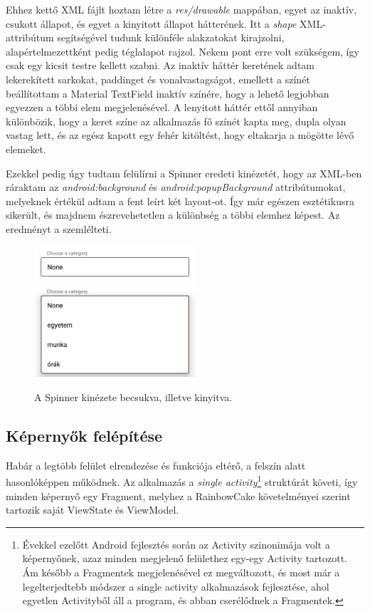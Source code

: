 Ehhez kettő XML fájlt hoztam létre a \emph{res/drawable} mappában, egyet az inaktív, csukott állapot, és egyet a kinyitott állapot hátterének. Itt a \emph{shape} XML-attribútum segítségével tudunk különféle alakzatokat kirajzolni, alapértelmezettként pedig téglalapot rajzol. Nekem pont erre volt szükségem, így csak egy kicsit testre kellett szabni. Az inaktív háttér keretének adtam lekerekített sarkokat, paddinget és vonalvastagságot, emellett a színét beállítottam a Material TextField inaktív színére, hogy a lehető legjobban egyezzen a többi elem megjelenésével. A lenyitott háttér ettől annyiban különbözik, hogy a keret színe az alkalmazás fő színét kapta meg, dupla olyan vastag lett, és az egész kapott egy fehér kitöltést, hogy eltakarja a mögötte lévő elemeket. 

Ezekkel pedig úgy tudtam felülírni a Spinner eredeti kinézetét, hogy az XML-ben ráraktam az \emph{android:background} és \emph{android:popupBackground} attribútumokat, melyeknek értékül adtam a fent leírt két layout-ot. Így már egészen esztétikusra sikerült, és majdnem észrevehetetlen a különbség a többi elemhez képest. Az eredményt a  szemlélteti.

\begin{figure}[!ht]
	\centering
	\includegraphics[width=60mm, keepaspectratio]{figures/custom_spinner_closed.png}
	\includegraphics[width=60mm, keepaspectratio]{figures/custom_spinner_open.png}
	\caption{A Spinner kinézete becsukva, illetve kinyitva.}
	\label{fig:CustomSpinner}
\end{figure}

\subsection{Képernyők felépítése}
Habár a legtöbb felület elrendezése és funkciója eltérő, a felszín alatt hasonlóképpen működnek. Az alkalmazás a \emph{single activity}\footnote{Évekkel ezelőtt Android fejlesztés során az Activity szinonimája volt a képernyőnek, azaz minden megjelenő felülethez egy-egy Activity tartozott. Ám később a Fragmentek megjelenésével ez megváltozott, és most már a legelterjedtebb módszer a single activity alkalmazások fejlesztése, ahol egyetlen Activityből áll a program, és abban cserélődnek a Fragmentek.} struktúrát követi, így minden képernyő egy Fragment, melyhez a RainbowCake követelményei szerint tartozik saját ViewState és ViewModel. 

